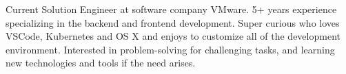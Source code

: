 

\begin{cvparagraph}

Current Solution Engineer at software company VMware. 5+ years experience specializing in the backend and frontend development. Super curious who loves VSCode, Kubernetes and OS X and enjoys to customize all of the development environment. Interested in problem-solving for challenging tasks, and learning new technologies and tools if the need arises.
\end{cvparagraph}

